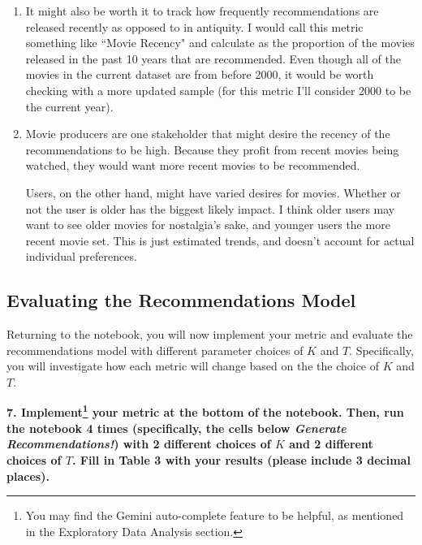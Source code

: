 \documentclass{article}
\begin{document}
\bigskip
\begin{mdframed}
\begin{enumerate}[label=\Alph*.]
    \item It might also be worth it to track how frequently recommendations are released recently as opposed to in antiquity. I would call this metric something like ``Movie Recency" and calculate as the proportion of the movies released in the past 10 years that are recommended. Even though all of the movies in the current dataset are from before 2000, it would be worth checking with a more updated sample (for this metric I'll consider 2000 to be the current year).
    \item Movie producers are one stakeholder that might desire the recency of the recommendations to be high. Because they profit from recent movies being watched, they would want more recent movies to be recommended. 

    Users, on the other hand, might have varied desires for movies. Whether or not the user is older has the biggest likely impact. I think older users may want to see older movies for nostalgia's sake, and younger users the more recent movie set. This is just estimated trends, and doesn't account for actual individual preferences.
\end{enumerate}
\end{mdframed}
\bigskip


\subsection*{Evaluating the Recommendations Model}

Returning to the notebook, you will now implement your metric and evaluate the recommendations model with different parameter choices of $K$ and $T$. Specifically, you will investigate how each metric will change based on the the choice of $K$ and $T$.

\textbf{7. Implement\footnote{You may find the Gemini auto-complete feature to be helpful, as mentioned in the Exploratory Data Analysis section.} your metric at the bottom of the notebook. Then, run the notebook 4 times (specifically, the cells below \textit{Generate Recommendations!}) with 2 different choices of $K$ and 2 different choices of $T$. Fill in Table 3 with your results (please include 3 decimal places).}
\end{document}
